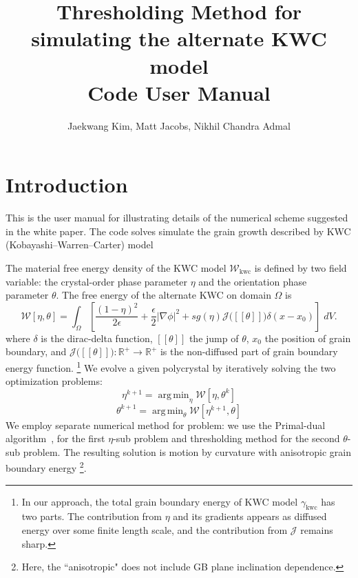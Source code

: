 \documentclass[11pt]{article}
\newcommand{\argmin}{\mathop{\mathrm{arg\,min}}}
\begin{document}
\title{Thresholding Method for simulating the alternate KWC model\\ Code User Manual}
\author{Jaekwang Kim, Matt Jacobs, Nikhil Chandra Admal} 

\maketitle 
\sectionfont{\fontsize{14}{14}\selectfont}

\normalsize

\section{Introduction}

This is the user manual for illustrating details of 
the numerical scheme suggested in the white paper.
The code solves simulate  the grain growth described by   
KWC (Kobayashi--Warren--Carter) model~\cite{KWC:1998,KWC:2001,KWC:2003}

The material free energy density of the KWC model $\mathcal{W}_{\mathrm{kwc}}$  
is defined by two field variable: the crystal-order phase parameter $\eta$ 
and the orientation phase parameter $\theta$. 
The free energy of the alternate KWC on domain $\Omega$ is 
\begin{equation}
\mathcal{W}[\eta,\theta] = \int_{\Omega}
\left[ \frac{(1-\eta)^2}{2 \epsilon} + \frac{\epsilon}{2}|\nabla \phi|^2
+sg(\eta) \mathcal{J}\big( [\![\theta ]\!]\big) \delta(x-x_0) 
\right]\; dV.
\label{eqn:alternateKWC}
\end{equation}
where $\delta$ is the dirac-delta function, 
$[\![\theta]\!]$ the jump of $\theta$, 
$x_0$ the position of grain boundary, and 
$\mathcal{J}\big( [\![\theta ]\!]\big): \mathbb{R}^{+} \to \mathbb{R}^{+}$
is the non-diffused part of grain boundary energy function.
\footnote{In our approach, the total grain boundary energy 
of KWC model $\gamma_{\mathrm{kwc}}$ has two parts. 
The contribution from $\eta$ and its gradients appears as diffused 
energy over some finite length scale, and the contribution from $\mathcal{J}$
remains sharp.
}
We evolve a given polycrystal
by iteratively solving the two optimization problems:
\begin{equation}
\eta^{k+1}=\argmin_\eta \mathcal{W}[\eta, \theta^{k}] 
\label{eqn:eta_sub}
\end{equation}
\begin{equation}
\theta^{k+1}=\argmin_\theta  \mathcal{W}[\eta^{k+1}, \theta] 
\label{eqn:theta_sub}
\end{equation}
We employ separate numerical method for problem:
we use the Primal-dual algorithm~\cite{Chambolle:2011,Jacobs:2019}, 
for the first $\eta$-sub problem and thresholding method for 
the second $\theta$-sub problem. 
The resulting solution is motion by curvature 
with anisotropic grain boundary energy
\footnote{
Here, the ``anisotropic" does not include GB plane inclination dependence.
}.
\end{document}
